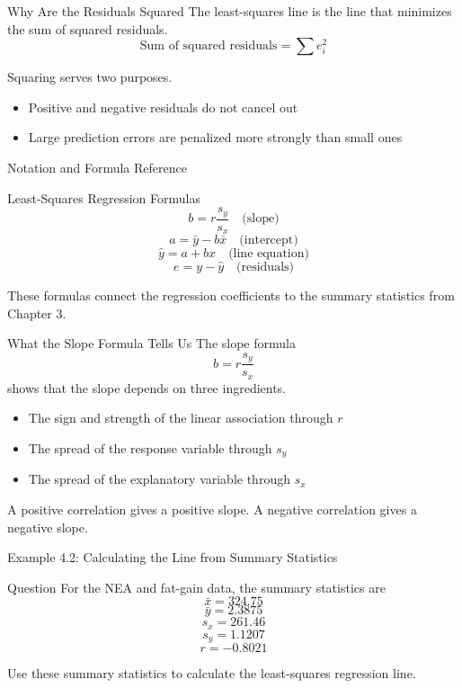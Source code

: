\documentclass[aspectratio=169]{beamer}
\begin{document}
\begin{frame}{Why Are the Residuals Squared}
The least-squares line is the line that minimizes the sum of squared residuals.
$$\text{Sum of squared residuals}=\sum e_i^2$$

Squaring serves two purposes.
\begin{itemize}
  \item Positive and negative residuals do not cancel out
  \item Large prediction errors are penalized more strongly than small ones
\end{itemize}
\end{frame}

\begin{frame}{Notation and Formula Reference}
\begin{block}{Least-Squares Regression Formulas}
$$b=r\frac{s_y}{s_x} \quad \text{(slope)}$$
$$a=\bar y-b\bar x  \quad \text{(intercept)}$$
$$\hat y=a+bx  \quad \text{(line equation)}$$
$$e=y-\hat y  \quad \text{(residuals)}$$
\end{block}

These formulas connect the regression coefficients to the summary statistics from Chapter 3.
\end{frame}

\begin{frame}{What the Slope Formula Tells Us}
The slope formula
$$b=r\frac{s_y}{s_x}$$
shows that the slope depends on three ingredients.
\begin{itemize}
	\item The sign and strength of the linear association through $r$
	\item The spread of the response variable through $s_y$
	\item The spread of the explanatory variable through $s_x$
\end{itemize}
A positive correlation gives a positive slope. A negative correlation gives a negative slope.
\end{frame}

\begin{frame}{Example 4.2: Calculating the Line from Summary Statistics}
\begin{block}{Question}
For the NEA and fat-gain data, the summary statistics are
$$\bar x=324.75$$
$$\bar y=2.3875$$
$$s_x=261.46$$
$$s_y=1.1207$$
$$r=-0.8021$$

Use these summary statistics to calculate the least-squares regression line.
\end{block}
\end{frame}
\end{document}
